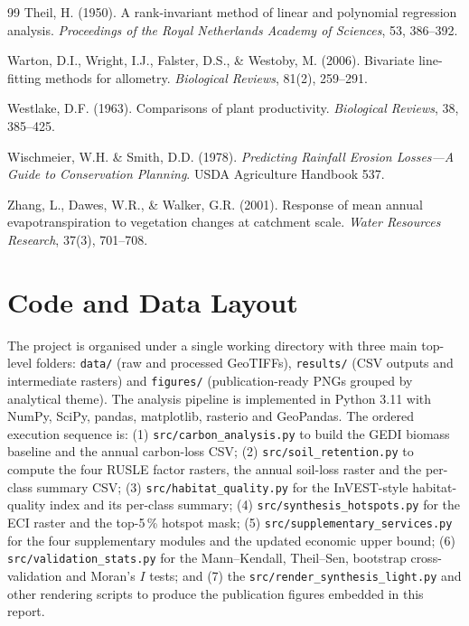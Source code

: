 \documentclass[12pt,a4paper]{article}
\begin{document}
\begin{thebibliography}{99}
Theil, H. (1950).
A rank-invariant method of linear and polynomial regression
analysis.
\textit{Proceedings of the Royal Netherlands Academy of Sciences},
53, 386--392.

Warton, D.I., Wright, I.J., Falster, D.S., \& Westoby, M. (2006).
Bivariate line-fitting methods for allometry.
\textit{Biological Reviews}, 81(2), 259--291.

Westlake, D.F. (1963).
Comparisons of plant productivity.
\textit{Biological Reviews}, 38, 385--425.

Wischmeier, W.H. \& Smith, D.D. (1978).
\textit{Predicting Rainfall Erosion Losses---A Guide to Conservation
Planning}. USDA Agriculture Handbook 537.

Zhang, L., Dawes, W.R., \& Walker, G.R. (2001).
Response of mean annual evapotranspiration to vegetation changes at
catchment scale.
\textit{Water Resources Research}, 37(3), 701--708.

\end{thebibliography}

\appendix

\section{Code and Data Layout}

The project is organised under a single working directory with three
main top-level folders: \texttt{data/} (raw and processed
GeoTIFFs), \texttt{results/} (CSV outputs and intermediate rasters)
and \texttt{figures/} (publication-ready PNGs grouped by analytical
theme). The analysis pipeline is implemented in Python 3.11 with
NumPy, SciPy, pandas, matplotlib, rasterio and GeoPandas. The
ordered execution sequence is: (1) \texttt{src/carbon\_analysis.py}
to build the GEDI biomass baseline and the annual carbon-loss CSV;
(2) \texttt{src/soil\_retention.py} to compute the four RUSLE factor
rasters, the annual soil-loss raster and the per-class summary CSV;
(3) \texttt{src/habitat\_quality.py} for the InVEST-style
habitat-quality index and its per-class summary; (4)
\texttt{src/synthesis\_hotspots.py} for the ECI raster and the
top-5\,\% hotspot mask; (5)
\texttt{src/supplementary\_services.py} for the four supplementary
modules and the updated economic upper bound; (6)
\texttt{src/validation\_stats.py} for the Mann--Kendall, Theil--Sen,
bootstrap cross-validation and Moran's $I$ tests; and (7) the
\texttt{src/render\_synthesis\_light.py} and other rendering scripts
to produce the publication figures embedded in this report.
\end{document}
